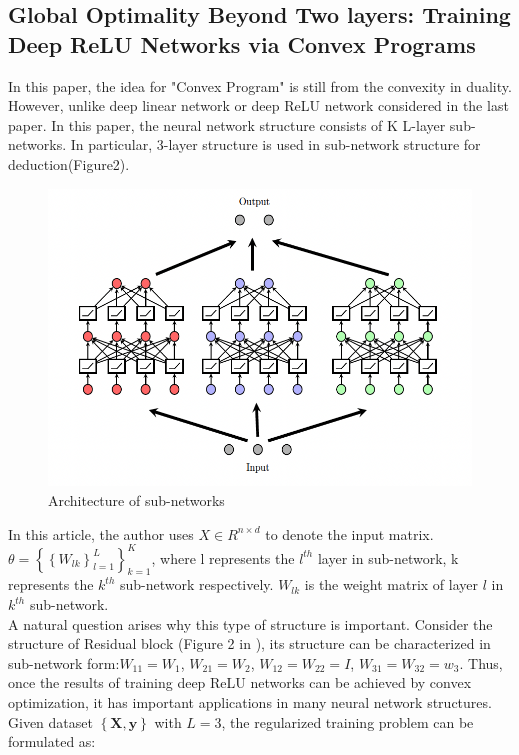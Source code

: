 \documentclass{article}
\begin{document}
\subsection{Global Optimality Beyond Two layers: Training Deep ReLU Networks via Convex Programs }
In this paper, the idea for "Convex Program" is still from the convexity in duality. However, unlike deep linear network or deep ReLU network considered in the last paper. In this paper, the neural network structure consists of K L-layer sub-networks. In particular, 3-layer structure is used in sub-network structure for deduction(Figure2).
\begin{figure}[H]
    \centering
    \includegraphics[scale=0.4]{ProjectSubmissionFiles/Fig1.png}
    \caption{Architecture of sub-networks }
    \label{fig1}
\end{figure}
In this article, the author uses $X\in R^{n\times d}$ to denote the input matrix. $\theta=\left \{ \left \{ W_{lk} \right \}_{l=1}^L \right \}_{k=1}^K $, where l represents the $l^{th}$ layer in sub-network, k represents the $k^{th}$ sub-network respectively. $W_{lk}$ is the weight matrix of layer $l$ in $k^{th}$ sub-network. \\ 
A natural question arises why this type of structure is important. Consider the structure of Residual block (Figure 2 in \cite{Resnet}), its structure can be characterized in sub-network form:$W_{11}=W_1$, $W_{21}=W_2$, $W_{12}=W_{22}=I$, $W_{31}=W_{32}=w_3$. Thus, once the results of training deep ReLU networks can be achieved by convex optimization, it has important applications in many neural network structures.\\
Given dataset $\left \{\mathbf{X},\mathbf{y}  \right \}$ with $L=3$, the regularized training problem can be formulated as:
\end{document}
